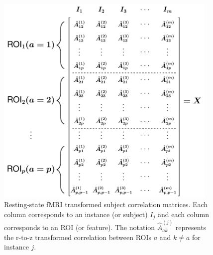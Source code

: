 \documentclass[aoas]{imsart}
\begin{document}
\begin{figure}[H]
\begin{minipage}[c]{0.7\textwidth}
	\includegraphics[width=0.95\textwidth]{rs_fmri_all_instance_matrix.pdf}
\end{minipage}\hfill
\begin{minipage}[c]{0.29\textwidth}
	\caption{Resting-state fMRI transformed subject correlation matrices. Each column corresponds to an instance (or subject) $I_j$ and each column corresponds to an ROI (or feature). The notation $\hat{A}^{(j)}_{ak}$ represents the r-to-z transformed correlation between ROIs $a$ and $k \neq a$ for instance $j$.}\label{fig:rs-fMRI_matrix}
\end{minipage}
\end{figure}
\end{document}
